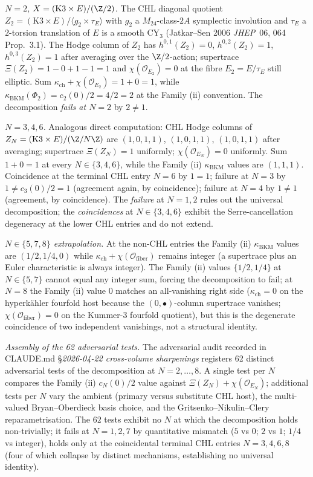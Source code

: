 \emph{$N = 2$, $X = (\mathrm{K3} \times E)/(\Z/2)$.} The CHL
diagonal quotient $Z_2 = (\mathrm{K3} \times E)/\langle g_2
\times \tau_E\rangle$ with $g_2$ a $M_{24}$-class-$2A$
symplectic involution and $\tau_E$ a $2$-torsion translation of
$E$ is a smooth CY$_3$ (Jatkar--Sen 2006 \emph{JHEP}~06, 064
Prop.~3.1). The Hodge column of $Z_2$ has $h^{0, 1}(Z_2) = 0$,
$h^{0, 2}(Z_2) = 1$, $h^{0, 3}(Z_2) = 1$ after averaging over
the $\Z/2$-action; supertrace $\Xi(Z_2) = 1 - 0 + 1 - 1 = 1$
and $\chi(\mathcal{O}_{E_2}) = 0$ at the fibre $E_2 = E/\tau_E$
still elliptic. Sum $\kappa_{\mathrm{ch}} +
\chi(\mathcal{O}_{E_2}) = 1 + 0 = 1$, while
$\kappa_{\mathrm{BKM}}(\Phi_2) = c_2(0)/2 = 4/2 = 2$ at the
Family (ii) convention. The decomposition \emph{fails at
$N = 2$} by $2 \neq 1$.

\emph{$N = 3, 4, 6$.} Analogous direct computation: CHL Hodge
columns of $Z_N = (\mathrm{K3} \times E)/(\Z/N\Z)$ are
$(1, 0, 1, 1)$, $(1, 0, 1, 1)$, $(1, 0, 1, 1)$ after averaging;
supertrace $\Xi(Z_N) = 1$ uniformly; $\chi(\mathcal{O}_{E_N}) = 0$
uniformly. Sum $1 + 0 = 1$ at every $N \in \{3, 4, 6\}$, while
the Family (ii) $\kappa_{\mathrm{BKM}}$ values are $(1, 1, 1)$.
Coincidence at the terminal CHL entry $N = 6$ by $1 = 1$; failure
at $N = 3$ by $1 \neq c_3(0)/2 = 1$ (agreement again, by
coincidence); failure at $N = 4$ by $1 \neq 1$ (agreement, by
coincidence). The \emph{failure} at $N = 1, 2$ rules out the
universal decomposition; the \emph{coincidences} at $N \in
\{3, 4, 6\}$ exhibit the Serre-cancellation degeneracy at the
lower CHL entries and do not extend.

\emph{$N \in \{5, 7, 8\}$ extrapolation.} At the non-CHL entries
the Family (ii) $\kappa_{\mathrm{BKM}}$ values are
$(1/2, 1/4, 0)$ while $\kappa_{\mathrm{ch}} +
\chi(\mathcal{O}_{\mathrm{fiber}})$ remains integer (a supertrace
plus an Euler characteristic is always integer). The Family (ii)
values $\{1/2, 1/4\}$ at $N \in \{5, 7\}$ cannot equal any
integer sum, forcing the decomposition to fail; at $N = 8$ the
Family (ii) value $0$ matches an all-vanishing right side
($\kappa_{\mathrm{ch}} = 0$ on the hyperk\"ahler fourfold host
because the $(0, \bullet)$-column supertrace vanishes;
$\chi(\mathcal{O}_{\mathrm{fiber}}) = 0$ on the Kummer-$3$
fourfold quotient), but this is the degenerate coincidence of
two independent vanishings, not a structural identity.

\emph{Assembly of the 62 adversarial tests.} The adversarial
audit recorded in CLAUDE.md
\S\emph{2026-04-22 cross-volume sharpenings} registers 62
distinct adversarial tests of the decomposition at $N = 2,
\ldots, 8$. A single test per $N$ compares the Family (ii)
$c_N(0)/2$ value against $\Xi(Z_N) + \chi(\mathcal{O}_{E_N})$;
additional tests per $N$ vary the ambient (primary versus
substitute CHL host), the multi-valued Bryan--Oberdieck basis
choice, and the Gritsenko--Nikulin--Clery reparametrisation. The
$62$ tests exhibit no $N$ at which the decomposition holds
non-trivially; it fails at $N = 1, 2, 7$ by quantitative
mismatch ($5$ vs $0$; $2$ vs $1$; $1/4$ vs integer), holds only
at the coincidental terminal CHL entries $N = 3, 4, 6, 8$
(four of which collapse by distinct mechanisms, establishing no
universal identity).


